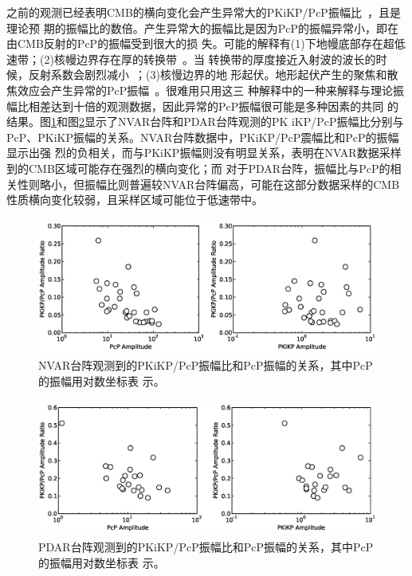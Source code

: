 之前的观测已经表明CMB的横向变化会产生异常大的PKiKP/PcP振幅比~\citep{Koper2004a}，且是理论预
期的振幅比的数倍。产生异常大的振幅比是因为PcP的振幅异常小，即在由CMB反射的PcP的振幅受到很大的损
失。可能的解释有(1)下地幔底部存在超低速带；(2)核幔边界存在厚的转换带~\citep{Garnero2000}。当
转换带的厚度接近入射波的波长的时候，反射系数会剧烈减小~\citep{richards1972}；(3)核慢边界的地
形起伏。地形起伏产生的聚焦和散焦效应会产生异常的PcP振幅~\citep{Neuberg1991}。很难用只用这三
种解释中的一种来解释与理论振幅比相差达到十倍的观测数据，因此异常的PcP振幅很可能是多种因素的共同
的结果。图\ref{nvar_ratio_cor}和图\ref{pdar_ratio_cor}显示了NVAR台阵和PDAR台阵观测的PK
iKP/PcP振幅比分别与PcP、PKiKP振幅的关系。NVAR台阵数据中，PKiKP/PcP震幅比和PcP的振幅显示出强
烈的负相关，而与PKiKP振幅则没有明显关系，表明在NVAR数据采样到的CMB区域可能存在强烈的横向变化；而
对于PDAR台阵，振幅比与PcP的相关性则略小，但振幅比则普遍较NVAR台阵偏高，可能在这部分数据采样的CMB
性质横向变化较弱，且采样区域可能位于低速带中。

\begin{figure}[!ht]
	\centering
	\includegraphics[width=12cm,height=4.5cm]{fig/chap4/nvar_ratio_cor.eps}
	\caption{NVAR台阵观测到的PKiKP/PcP振幅比和PcP振幅的关系，其中PcP的振幅用对数坐标表%
示。}
	\label{nvar_ratio_cor}
\end{figure}

\begin{figure}[!ht]
	\centering
	\includegraphics[width=12cm,height=4.5cm]{fig/chap4/pdar_ratio_cor.eps}
	\caption{PDAR台阵观测到的PKiKP/PcP振幅比和PcP振幅的关系，其中PcP的振幅用对数坐标表%
示。}
	\label{pdar_ratio_cor}
\end{figure}

